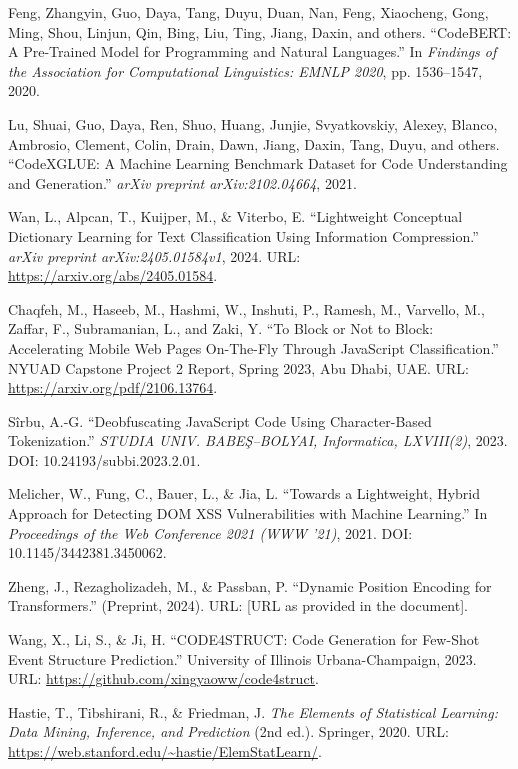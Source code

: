 \documentclass[a4paper, 11pt, twoside, openright]{report}
\begin{document}
\begin{thebibliography}{99}
 Feng, Zhangyin, Guo, Daya, Tang, Duyu, Duan, Nan, Feng, Xiaocheng, Gong, Ming, Shou, Linjun, Qin, Bing, Liu, Ting, Jiang, Daxin, and others.
``CodeBERT: A Pre-Trained Model for Programming and Natural Languages.'' In \textit{Findings of the Association for Computational Linguistics: EMNLP 2020}, pp. 1536--1547, 2020.

 Lu, Shuai, Guo, Daya, Ren, Shuo, Huang, Junjie, Svyatkovskiy, Alexey, Blanco, Ambrosio, Clement, Colin, Drain, Dawn, Jiang, Daxin, Tang, Duyu, and others.
``CodeXGLUE: A Machine Learning Benchmark Dataset for Code Understanding and Generation.'' \textit{arXiv preprint arXiv:2102.04664}, 2021.

Wan, L., Alpcan, T., Kuijper, M., \& Viterbo, E.  
``Lightweight Conceptual Dictionary Learning for Text Classification Using Information Compression.''  
\textit{arXiv preprint arXiv:2405.01584v1}, 2024.  
URL: \url{https://arxiv.org/abs/2405.01584}.

Chaqfeh, M., Haseeb, M., Hashmi, W., Inshuti, P., Ramesh, M., Varvello, M., Zaffar, F., Subramanian, L., and Zaki, Y.  
``To Block or Not to Block: Accelerating Mobile Web Pages On-The-Fly Through JavaScript Classification.''  
NYUAD Capstone Project 2 Report, Spring 2023, Abu Dhabi, UAE.  
URL: \url{https://arxiv.org/pdf/2106.13764}.

Sîrbu, A.-G.  
``Deobfuscating JavaScript Code Using Character-Based Tokenization.''  
\textit{STUDIA UNIV. BABEŞ–BOLYAI, Informatica, LXVIII(2)}, 2023.  
DOI: 10.24193/subbi.2023.2.01.

Melicher, W., Fung, C., Bauer, L., \& Jia, L.  
``Towards a Lightweight, Hybrid Approach for Detecting DOM XSS Vulnerabilities with Machine Learning.''  
In \textit{Proceedings of the Web Conference 2021 (WWW ’21)}, 2021.  
DOI: 10.1145/3442381.3450062.

Zheng, J., Rezagholizadeh, M., \& Passban, P.  
``Dynamic Position Encoding for Transformers.''  
(Preprint, 2024).  
URL: [URL as provided in the document].

Wang, X., Li, S., \& Ji, H.  
``CODE4STRUCT: Code Generation for Few-Shot Event Structure Prediction.''  
University of Illinois Urbana-Champaign, 2023.  
URL: \url{https://github.com/xingyaoww/code4struct}.

Hastie, T., Tibshirani, R., \& Friedman, J.  
\textit{The Elements of Statistical Learning: Data Mining, Inference, and Prediction} (2nd ed.).  
Springer, 2020.  
URL: \url{https://web.stanford.edu/~hastie/ElemStatLearn/}.


\end{thebibliography}
\end{document}
